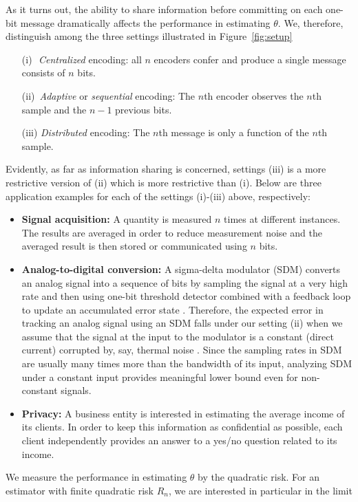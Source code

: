 As it turns out, the ability to share information
before committing on each one-bit message dramatically affects the
performance in estimating $\theta$. We, therefore, distinguish among the
three settings illustrated in Figure~\ref{fig:setup}
\begin{itemize}
 \item[(i)\,\,] \emph{Centralized} encoding: all $n$ encoders confer and produce a single message consists of $n$ bits.
 \item[(ii)\,] \emph{Adaptive} or \emph{sequential} encoding: The $n$th encoder observes the $n$th sample and the $n-1$ previous bits.
 \item[(iii)] \emph{Distributed} encoding: The $n$th message is only a function of the $n$th sample.
 \end{itemize}
Evidently, as far as information sharing is concerned, settings (iii) is a more restrictive version of (ii) which is more restrictive than (i). Below are three application examples for each of the settings (i)-(iii) above, respectively:
\begin{itemize}
\item {\bf Signal acquisition:} A quantity is measured $n$ times at different instances. The results are averaged in order to reduce measurement noise and the averaged result is then stored or communicated using $n$ bits. 
\item {\bf Analog-to-digital conversion:} A sigma-delta modulator (SDM) converts an analog signal into a sequence of bits by sampling the signal at a very high rate and then using one-bit threshold detector combined with a feedback loop to update an accumulated error state \cite{1092194}. Therefore, the expected error in tracking an analog signal using an SDM falls under our setting (ii) when we assume that the signal at the input to the modulator is a constant (direct current) corrupted by, say, thermal noise \cite{53738}. Since the sampling rates in SDM are usually many times more than the bandwidth of its input, analyzing SDM under a constant input provides meaningful lower bound even for non-constant signals.
\item {\bf Privacy:} A business entity is interested in estimating the average income of its clients. In order to keep this information as confidential as possible, each client independently provides an answer to a yes/no question related to its income.
\end{itemize}
%
We measure the performance in estimating $\theta$ by the quadratic risk. For an estimator with finite quadratic risk $R_n$, we are interested in particular in the limit
